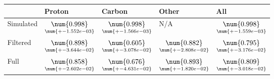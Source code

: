 \begin{tabular}{lllll}
\toprule
{} &                                              Proton &                                              Carbon &                                               Other &                                                 All \\
\midrule
Simulated &  $\underset{\num{+- 1.552e-03 }  }{\num{ 0.998 } }$ &  $\underset{\num{+- 1.566e-03 }  }{\num{ 0.998 } }$ &  N/A &  $\underset{\num{+- 1.559e-03 }  }{\num{ 0.998 } }$ \\
Filtered  &  $\underset{\num{+- 3.644e-02 }  }{\num{ 0.898 } }$ &  $\underset{\num{+- 3.078e-02 }  }{\num{ 0.605 } }$ &  $\underset{\num{+- 2.808e-02 }  }{\num{ 0.882 } }$ &  $\underset{\num{+- 3.176e-02 }  }{\num{ 0.795 } }$ \\
Full      &  $\underset{\num{+- 2.602e-02 }  }{\num{ 0.858 } }$ &  $\underset{\num{+- 4.631e-02 }  }{\num{ 0.676 } }$ &  $\underset{\num{+- 1.820e-02 }  }{\num{ 0.893 } }$ &  $\underset{\num{+- 3.018e-02 }  }{\num{ 0.809 } }$ \\
\bottomrule
\end{tabular}
